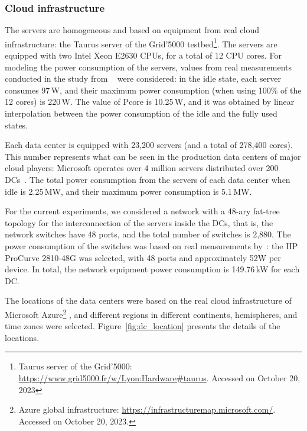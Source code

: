 \label{sec:settings_ccgrid}


\subsubsection{Cloud infrastructure}

The servers are homogeneous and based on equipment from real cloud infrastructure: the Taurus server of the Grid'5000 testbed\footnote{Taurus server of the Grid'5000: \url{https://www.grid5000.fr/w/Lyon:Hardware\#taurus}. Accessed on October 20, 2023}. The servers are equipped with two Intel Xeon E2630 CPUs, for a total of 12 CPU cores. For modeling the power consumption of the servers, values from real measurements conducted in the study from ~\citet{ahvar22_estimating_cloud_cons} were considered: in the idle state, each server consumes 97\,W, and their maximum power consumption (when using 100\% of the 12 cores) is 220\,W. The value of Pcore is 10.25\,W, and it was obtained by linear interpolation between the power consumption of the idle and the fully used states.

Each data center is equipped with 23,200 servers (and a total of 278,400 cores). This number represents what can be seen in the production data centers of major cloud players: Microsoft operates over 4 million servers distributed over 200 DCs~\cite{roach2021_microsoftazure}. The total power consumption from the servers of each data center when idle is 2.25\,MW, and their maximum power consumption is 5.1\,MW.

For the current experiments, we considered a network with a 48-ary fat-tree topology for the interconnection of the servers inside the DCs, that is, the network switches have 48 ports, and the total number of switches is 2,880. The power consumption of the switches was based on real measurements by~\citet{Hlavacs2009_energy_network_devices}: the HP ProCurve 2810-48G was selected, with 48 ports and approximately 52W per device. In total, the network equipment power consumption is 149.76\,kW for each DC.

The locations of the data centers were based on the real cloud infrastructure of Microsoft Azure\footnote{Azure global infrastructure: \url{https://infrastructuremap.microsoft.com/}. Accessed on October 20, 2023.} , and different regions in different continents, hemispheres, and time zones were selected. Figure~\ref{fig:dc_location} presents the details of the locations.

